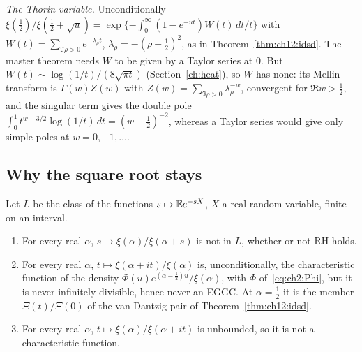 \emph{The Thorin variable.} Unconditionally $\xi(\frac12)/\xi(\frac12+\sqrt u)=\exp\{-\int_0^\infty(1-e^{-ut})W(t)\,dt/t\}$ with $W(t)=\sum_{\Im\rho>0}e^{-\lambda_\rho t}$, $\lambda_\rho=-(\rho-\frac12)^2$, as in Theorem~\ref{thm:ch12:idsd}. The master theorem needs $W$ to be given by a Taylor series at $0$. But $W(t)\sim\log(1/t)/(8\sqrt{\pi t})$ (Section~\ref{ch:heat}), so $W$ has none: its Mellin transform is $\Gamma(w)Z(w)$ with $Z(w)=\sum_{\Im\rho>0}\lambda_\rho^{-w}$, convergent for $\Re w>\frac12$, and the singular term gives the double pole $\int_0^1t^{w-3/2}\log(1/t)\,dt=(w-\frac12)^{-2}$, whereas a Taylor series would give only simple poles at $w=0,-1,\dots$.

\subsection{Why the square root stays}\label{tx:sec:nosqrt}

Let $L$ be the class of the functions $s\mapsto\mathbb{E} e^{-sX}$, $X$ a real random variable, finite on an interval.

\begin{theorem}\label{tx:thm:nosqrt}
\begin{enumerate}
\item[(a)] For every real $\alpha$, $s\mapsto\xi(\alpha)/\xi(\alpha+s)$ is not in $L$, whether or not RH holds.
\item[(b)] For every real $\alpha$, $t\mapsto\xi(\alpha+it)/\xi(\alpha)$ is, unconditionally, the characteristic function of the density $\Phi(u)e^{(\alpha-\frac12)u}/\xi(\alpha)$, with $\Phi$ of~\eqref{eq:ch2:Phi}, but it is never infinitely divisible, hence never an EGGC. At $\alpha=\frac12$ it is the member $\Xi(t)/\Xi(0)$ of the van Dantzig pair of Theorem~\ref{thm:ch12:idsd}.
\item[(c)] For every real $\alpha$, $t\mapsto\xi(\alpha)/\xi(\alpha+it)$ is unbounded, so it is not a characteristic function.
\end{enumerate}
\end{theorem}

